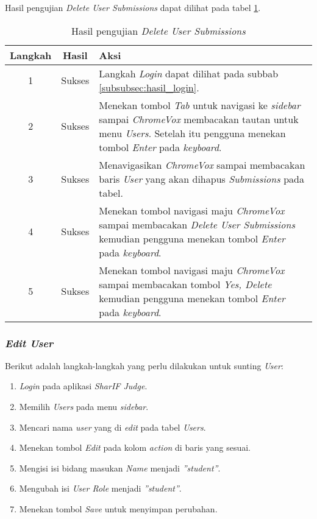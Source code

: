 Hasil pengujian \textit{Delete User Submissions} dapat dilihat pada tabel \ref{tab:hasil_delete_user_submissions}.

\begin{table}[H]
	\centering
	\caption{Hasil pengujian \textit{Delete User Submissions}}
	\label{tab:hasil_delete_user_submissions}
	\begin{tabular}{|c|c|p{12cm}|}
		\toprule
		Langkah & Hasil & Aksi\\
		\midrule
		1 & Sukses & Langkah \textit{Login} dapat dilihat pada subbab \ref{subsubsec:hasil_login}.\\
		2 & Sukses & Menekan tombol \textit{Tab} untuk navigasi ke \textit{sidebar} sampai \textit{ChromeVox} membacakan tautan untuk menu \textit{Users}. Setelah itu pengguna menekan tombol \textit{Enter} pada \textit{keyboard}.\\
		3 & Sukses & Menavigasikan \textit{ChromeVox} sampai membacakan baris \textit{User} yang akan dihapus \textit{Submissions} pada tabel.\\
		4 & Sukses & Menekan tombol navigasi maju \textit{ChromeVox} sampai membacakan \textit{Delete User Submissions} kemudian pengguna menekan tombol \textit{Enter} pada \textit{keyboard}.\\
		5 & Sukses & Menekan tombol navigasi maju \textit{ChromeVox} sampai membacakan tombol \textit{Yes, Delete} kemudian pengguna menekan tombol \textit{Enter} pada \textit{keyboard}.\\
		\bottomrule
	\end{tabular}
\end{table}

\subsubsection{\textit{Edit User}}
\label{subsubsec:skenario_edit_user}
Berikut adalah langkah-langkah yang perlu dilakukan untuk sunting \textit{User}:

\begin{enumerate}
	\item \textit{Login} pada aplikasi \textit{SharIF Judge}.
	\item Memilih \textit{Users} pada menu \textit{sidebar}.
	\item Mencari nama \textit{user} yang di \textit{edit} pada tabel \textit{Users}.
	\item Menekan tombol \textit{Edit} pada kolom \textit{action} di baris yang sesuai.
	\item Mengisi isi bidang masukan \textit{Name} menjadi \textit{''student''}.
	\item Mengubah isi \textit{User Role} menjadi \textit{''student''}. 
	\item Menekan tombol \textit{Save} untuk menyimpan perubahan.
\end{enumerate}	

